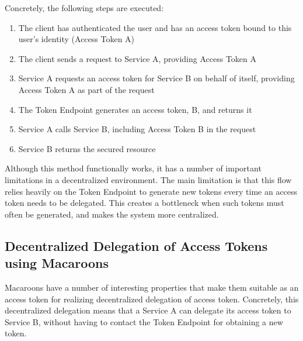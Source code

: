 \noindent Concretely, the following steps are executed:
\begin{enumerate}
    \item The client has authenticated the user and has an access token bound to this user's identity (Access Token A)
    \item The client sends a request to Service A, providing Access Token A
    \item Service A requests an access token for Service B on behalf of itself, providing Access Token A as part of the request
    \item The Token Endpoint generates an access token, B, and returns it
    \item Service A calls Service B, including Access Token B in the request
    \item Service B returns the secured resource
\end{enumerate}
\noindent Although this method functionally works, it has a number of important limitations in a decentralized environment. The main limitation is that this flow relies heavily on the Token Endpoint to generate new tokens every time an access token needs to be delegated. This creates a bottleneck when such tokens must often be generated, and makes the system more centralized. 

\newpage
\subsection{Decentralized Delegation of Access Tokens using Macaroons}
Macaroons have a number of interesting properties that make them suitable as an access token for realizing decentralized delegation of access token. Concretely, this decentralized delegation means that a Service A can delegate its access token to Service B, without having to contact the Token Endpoint for obtaining a new token.


